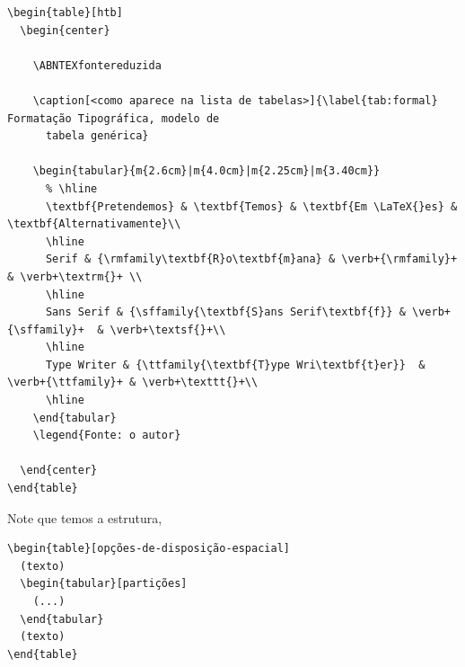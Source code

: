 \documentclass[11pt]{article}
\begin{document}
\begin{verbatim}
\begin{table}[htb]
  \begin{center}

    \ABNTEXfontereduzida

    \caption[<como aparece na lista de tabelas>]{\label{tab:formal} Formatação Tipográfica, modelo de
      tabela genérica}

    \begin{tabular}{m{2.6cm}|m{4.0cm}|m{2.25cm}|m{3.40cm}}
      % \hline
      \textbf{Pretendemos} & \textbf{Temos} & \textbf{Em \LaTeX{}es} & \textbf{Alternativamente}\\
      \hline
      Serif & {\rmfamily\textbf{R}o\textbf{m}ana} & \verb+{\rmfamily}+  & \verb+\textrm{}+ \\
      \hline
      Sans Serif & {\sffamily{\textbf{S}ans Serif\textbf{f}} & \verb+{\sffamily}+  & \verb+\textsf{}+\\
      \hline
      Type Writer & {\ttfamily{\textbf{T}ype Wri\textbf{t}er}}  & \verb+{\ttfamily}+ & \verb+\texttt{}+\\
      \hline
    \end{tabular}
    \legend{Fonte: o autor}

  \end{center}
\end{table}
\end{verbatim}

Note que temos a estrutura,

\begin{verbatim}
\begin{table}[opções-de-disposição-espacial]
  (texto)
  \begin{tabular}[partições]
    (...)
  \end{tabular}
  (texto)
\end{table}
\end{verbatim}
\end{document}

